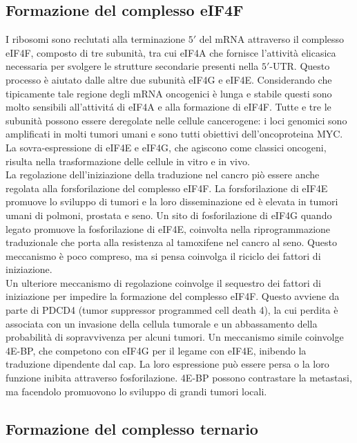 	\subsection{Formazione del complesso eIF4F}
	I ribosomi sono reclutati alla terminazione $5'$ del mRNA attraverso il complesso eIF4F, composto di tre subunit\`a, tra cui eIF4A che fornisce l'attivit\`a elicasica necessaria per svolgere le strutture secondarie presenti nella $5'$-UTR.
	Questo processo \`e aiutato dalle altre due subunit\`a eIF4G e eIF4E.
	Considerando che tipicamente tale regione degli mRNA oncogenici \`e lunga e stabile questi sono molto sensibili all'attivit\'a di eIF4A e alla formazione di eIF4F.
	Tutte e tre le subunit\`a possono essere deregolate nelle cellule cancerogene: i loci genomici sono amplificati in molti tumori umani e sono tutti obiettivi dell'oncoproteina MYC.
	La sovra-espressione di eIF4E e eIF4G, che agiscono come classici oncogeni, risulta nella trasformazione delle cellule in vitro e in vivo.\\
	La regolazione dell'iniziazione della traduzione nel cancro pi\`o essere anche regolata alla forsforilazione del complesso eIF4F.
	La forsforilazione di eIF4E promuove lo sviluppo di tumori e la loro disseminazione ed \`e elevata in tumori umani di polmoni, prostata e seno.
	Un sito di fosforilazione di eIF4G quando legato promuove la fosforilazione di eIF4E, coinvolta nella riprogrammazione traduzionale che porta alla resistenza al tamoxifene nel cancro al seno.
	Questo meccanismo \`e poco compreso, ma si pensa coinvolga il riciclo dei fattori di iniziazione.\\
	Un ulteriore meccanismo di regolazione coinvolge il sequestro dei fattori di iniziazione per impedire la formazione del complesso eIF4F.
	Questo avviene da parte di PDCD4 (tumor suppressor programmed cell death 4), la cui perdita \`e associata con un invasione della cellula tumorale e un abbassamento della probabilit\`a di sopravvivenza per alcuni tumori.
	Un meccanismo simile coinvolge 4E-BP, che competono con eIF4G per il legame con eIF4E, inibendo la traduzione dipendente dal cap.
	La loro espressione pu\`o essere persa o la loro funzione inibita attraverso fosforilazione.
	4E-BP possono contrastare la metastasi, ma facendolo promuovono lo sviluppo di grandi tumori locali.

	\subsection{Formazione del complesso ternario}

